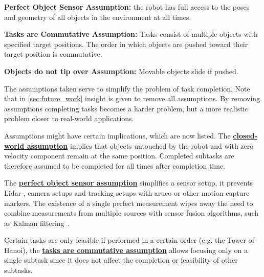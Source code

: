 \begin{assumption*}%
\label{assumption:perfect_object_sensor}
\textbf{Perfect Object Sensor Assumption:} the robot has full access to the poses and geometry of all objects in the environment at all times.
\end{assumption*}\bs


\begin{assumption*}%
\label{assumption:order_does_not_matter}
\textbf{Tasks are Commutative Assumption:} Tasks consist of multiple objects with specified target positions. The order in which objects are pushed toward their target position is commutative.
\end{assumption*}\bs

\begin{assumption*}%
\label{assumption:no_tipping}
\textbf{Objects do not tip over Assumption:} Movable objects slide if pushed.
\end{assumption*}\bs

The assumptions taken serve to simplify the problem of task completion. Note that in \cref{sec:future_work} insight is given to remove all assumptions. By removing assumptions completing tasks becomes a harder problem, but a more realistic problem closer to real-world applications.\bs

Assumptions might have certain implications, which are now listed. The \hyperref[assumption:closed_world]{\textbf{closed-world assumption}} implies that objects untouched by the robot and with zero velocity component remain at the same position. Completed subtasks are therefore assumed to be completed for all times after completion time.\bs

The \hyperref[assumption:perfect_object_sensor]{\textbf{perfect object sensor assumption}} simplifies a sensor setup, it prevents Lidar-, camera setups and tracking setups with aruco or other motion capture markers. The existence of a single perfect measurement wipes away the need to combine measurements from multiple sources with sensor fusion algorithms, such as Kalman filtering~\cite{verhaegen_filtering_2007}.\bs

Certain tasks are only feasible if performed in a certain order (e.g. the Tower of Hanoi), the \hyperref[assumption:order_does_not_matter]{\textbf{tasks are commutative assumption}} allows focusing only on a single subtask since it does not affect the completion or feasibility of other subtasks.\bs

